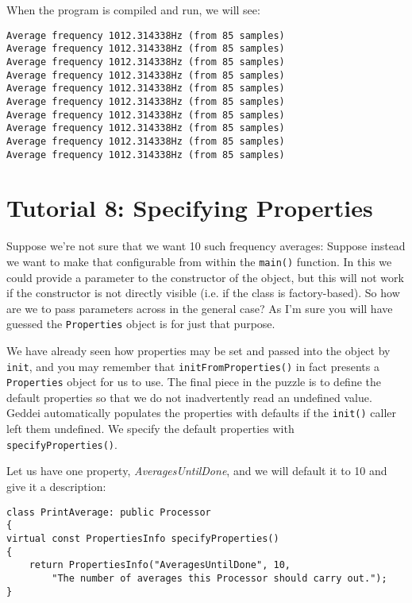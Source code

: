 When the program is compiled and run, we will see:

\begin{verbatim}
Average frequency 1012.314338Hz (from 85 samples)
Average frequency 1012.314338Hz (from 85 samples)
Average frequency 1012.314338Hz (from 85 samples)
Average frequency 1012.314338Hz (from 85 samples)
Average frequency 1012.314338Hz (from 85 samples)
Average frequency 1012.314338Hz (from 85 samples)
Average frequency 1012.314338Hz (from 85 samples)
Average frequency 1012.314338Hz (from 85 samples)
Average frequency 1012.314338Hz (from 85 samples)
Average frequency 1012.314338Hz (from 85 samples)
\end{verbatim}




\section{Tutorial 8: Specifying Properties}

Suppose we're not sure that we want 10 such frequency averages: Suppose instead we want to make that configurable from within the \texttt{main()} function. In this we could provide a parameter to the constructor of the object, but this will not work if the constructor is not directly visible (i.e. if the class is factory-based). So how are we to pass parameters across in the general case? As I'm sure you will have guessed the \texttt{Properties} object is for just that purpose.

We have already seen how properties may be set and passed into the object by \texttt{init}, and you may remember that \texttt{initFromProperties()} in fact presents a \texttt{Properties} object for us to use. The final piece in the puzzle is to define the default properties so that we do not inadvertently read an undefined value. Geddei automatically populates the properties with defaults if the \texttt{init()} caller left them undefined. We specify the default properties with \texttt{specifyProperties()}.

Let us have one property, \textit{AveragesUntilDone}, and we will default it to 10 and give it a description:

\begin{verbatim}
class PrintAverage: public Processor
{
virtual const PropertiesInfo specifyProperties()
{
    return PropertiesInfo("AveragesUntilDone", 10,
        "The number of averages this Processor should carry out.");
}
\end{verbatim}

